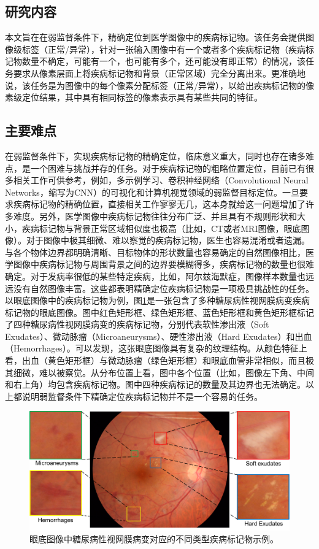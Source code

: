 \subsection{研究内容}
本文旨在在弱监督条件下，精确定位到医学图像中的疾病标记物。该任务会提供图像级标签（正常/异常），针对一张输入图像中有一个或者多个疾病标记物（疾病标记物数量不确定，可能有一个，也可能有多个，还可能没有即正常）的情况，该任务要求从像素层面上将疾病标记物和背景（正常区域）完全分离出来。更准确地说，该任务是为图像中的每个像素分配标签（正常/异常），以给出疾病标记物的像素级定位结果，其中具有相同标签的像素表示具有某些共同的特征。
\subsection{主要难点}
在弱监督条件下，实现疾病标记物的精确定位，临床意义重大，同时也存在诸多难点，是一个困难与挑战并存的任务。对于疾病标记物的粗略位置定位，目前已有很多相关工作可供参考，例如，多示例学习、卷积神经网络（Convolutional Neural Networks，缩写为CNN）的可视化和计算机视觉领域的弱监督目标定位。一旦要求疾病标记物的精确位置，直接相关工作寥寥无几，这本身就给这一问题增加了许多难度。另外，医学图像中疾病标记物往往分布广泛、并且具有不规则形状和大小，疾病标记物与背景正常区域相似度也极高（比如，CT或者MRI图像，眼底图像）。对于图像中极其细微、难以察觉的疾病标记物，医生也容易混淆或者遗漏。与各个物体边界都明确清晰、目标物体的形状数量也容易确定的自然图像相比，医学图像中疾病标记物与周围背景之间的边界要模糊得多，疾病标记物的数量也很难确定。对于发病率很低的某些特定疾病，比如，阿尔兹海默症，图像样本数量也远远没有自然图像丰富。这些都表明精确定位疾病标记物是一项极具挑战性的任务。以眼底图像中的疾病标记物为例，图\ref{fig:biomarker_localization_example}是一张包含了多种糖尿病性视网膜病变疾病标记物的眼底图像。图中红色矩形框、绿色矩形框、蓝色矩形框和黄色矩形框标记了四种糖尿病性视网膜病变的疾病标记物，分别代表软性渗出液（Soft Exudates）、微动脉瘤（Microaneurysms）、硬性渗出液（Hard Exudates）和出血（Hemorrhages）。可以发现，这张眼底图像具有复杂的纹理结构。从颜色特征上看，出血（黄色矩形框）与微动脉瘤（绿色矩形框）和眼底血管非常相似，而且极其细微，难以被察觉。从分布位置上看，图中各个位置（比如，图像左下角、中间和右上角）均包含疾病标记物。图中四种疾病标记的数量及其边界也无法确定。以上都说明弱监督条件下精确定位疾病标记物并不是一个容易的任务。
\begin{figure}[h!]
	\centering
	\includegraphics[width=1.0\textwidth]{figure/biomarker_localization_example}
	\caption[眼底图像中糖尿病性视网膜病变对应的不同类型疾病标记物示例]{眼底图像中糖尿病性视网膜病变对应的不同类型疾病标记物示例。} 
	\label{fig:biomarker_localization_example}
\end{figure}
